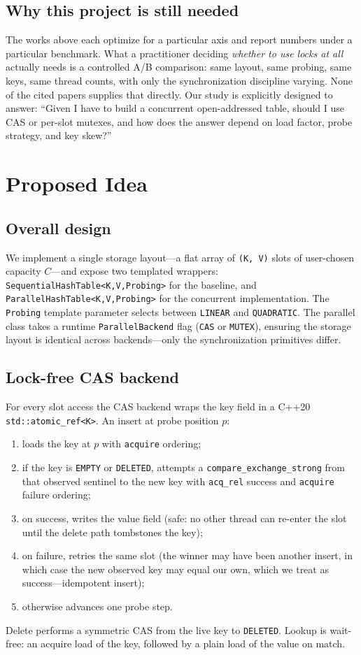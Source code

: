 \documentclass[10pt,twocolumn]{article}
\begin{document}
\subsection{Why this project is still needed}
The works above each optimize for a particular axis and report
numbers under a particular benchmark. What a practitioner deciding
\emph{whether to use locks at all} actually needs is a controlled
A/B comparison: same layout, same probing, same keys, same thread
counts, with only the synchronization discipline varying. None of
the cited papers supplies that directly. Our study is explicitly
designed to answer: ``Given I have to build a concurrent
open-addressed table, should I use CAS or per-slot mutexes, and how
does the answer depend on load factor, probe strategy, and key
skew?''

\section{Proposed Idea}
\subsection{Overall design}
We implement a single storage layout---a flat array of
\texttt{(K, V)} slots of user-chosen capacity $C$---and expose two
templated wrappers:
\texttt{SequentialHashTable<K,V,Probing>} for the baseline, and
\texttt{ParallelHashTable<K,V,Probing>} for the concurrent
implementation. The \texttt{Probing} template parameter selects
between \texttt{LINEAR} and \texttt{QUADRATIC}. The parallel class
takes a runtime \texttt{ParallelBackend} flag
(\texttt{CAS} or \texttt{MUTEX}), ensuring the storage
layout is identical across backends---only the synchronization
primitives differ.

\subsection{Lock-free CAS backend}
For every slot access the CAS backend wraps the key field in a
C++20 \texttt{std::atomic\_ref<K>}. An insert at probe position $p$:
\begin{enumerate}
  \item loads the key at $p$ with \texttt{acquire} ordering;
  \item if the key is \texttt{EMPTY} or \texttt{DELETED}, attempts a
  \texttt{compare\_exchange\_strong} from that observed sentinel to
  the new key with \texttt{acq\_rel} success and
  \texttt{acquire} failure ordering;
  \item on success, writes the value field (safe: no other thread
  can re-enter the slot until the delete path tombstones the key);
  \item on failure, retries the same slot (the winner may have been
  another insert, in which case the new observed key may equal our
  own, which we treat as success---idempotent insert);
  \item otherwise advances one probe step.
\end{enumerate}
Delete performs a symmetric CAS from the live key to
\texttt{DELETED}. Lookup is wait-free: an acquire load of the key,
followed by a plain load of the value on match.
\end{document}
